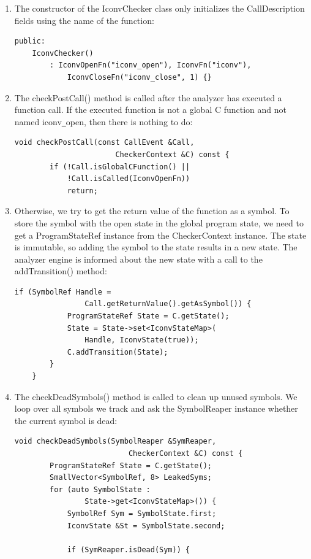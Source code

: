 \begin{enumerate}
\item The constructor of the IconvChecker class only initializes the CallDescription fields using the name of the function:
\begin{lstlisting}[caption={}]
public:
	IconvChecker()
		: IconvOpenFn("iconv_open"), IconvFn("iconv"),
			IconvCloseFn("iconv_close", 1) {}
\end{lstlisting}

\item The checkPostCall() method is called after the analyzer has executed a function call. If the executed function is not a global C function and not named iconv\underline{~}open, then there is nothing to do:
\begin{lstlisting}[caption={}]
	void checkPostCall(const CallEvent &Call,
					   CheckerContext &C) const {
		if (!Call.isGlobalCFunction() ||
			!Call.isCalled(IconvOpenFn))
			return;
\end{lstlisting}

\item Otherwise, we try to get the return value of the function as a symbol. To store the symbol with the open state in the global program state, we need to get a ProgramStateRef instance from the CheckerContext instance. The state is immutable, so adding the symbol to the state results in a new state. The analyzer engine is informed about the new state with a call to the addTransition() method:
\begin{lstlisting}[caption={}]
	if (SymbolRef Handle =
				Call.getReturnValue().getAsSymbol()) {
			ProgramStateRef State = C.getState();
			State = State->set<IconvStateMap>(
				Handle, IconvState(true));
			C.addTransition(State);
		}
	}
\end{lstlisting}

\item The checkDeadSymbols() method is called to clean up unused symbols. We loop over all symbols we track and ask the SymbolReaper instance whether the current symbol is dead:\par
\begin{lstlisting}[caption={}]
	void checkDeadSymbols(SymbolReaper &SymReaper,
						  CheckerContext &C) const {
		ProgramStateRef State = C.getState();
		SmallVector<SymbolRef, 8> LeakedSyms;
		for (auto SymbolState :
				State->get<IconvStateMap>()) {
			SymbolRef Sym = SymbolState.first;
			IconvState &St = SymbolState.second;
			
			if (SymReaper.isDead(Sym)) {
\end{lstlisting}


\end{enumerate}
